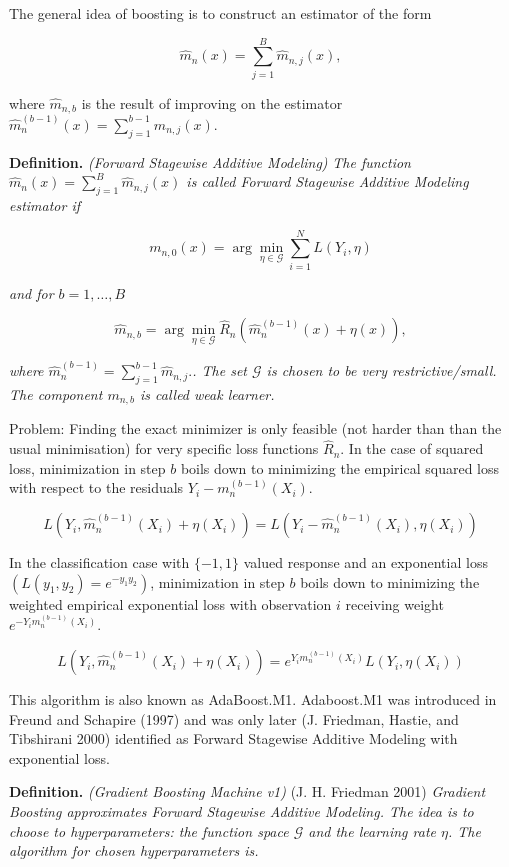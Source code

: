 \documentclass[a4paper,12pt,openany]{book}
\begin{document}
The general idea of boosting is to construct an estimator of the form

\[
\hat m_n(x)=\sum_{j=1}^B \hat m_{n,j}(x),
\]

where \(\hat m_{n,b}\) is the result of improving on the estimator \(\hat m_n^{(b-1)}(x)=\sum_{j=1}^{b-1} \hat m_{n,j}(x)\).

\textbf{Definition.} \emph{(Forward Stagewise Additive Modeling)} \emph{The function \(\hat m_n(x)=\sum_{j=1}^B \hat m_{n,j}(x)\) is called Forward Stagewise Additive Modeling estimator if}

\[
m_{n,0}(x)=\arg \min_{\eta\in \mathcal G} \sum_{i=1}^N L\left(Y_i, \eta\right)
\]

\emph{and for \(b=1,\dots,B\)}

\[
\hat m_{n,b} =  \arg \min_{\eta\in \mathcal G} \hat R_n\left( \hat m_n^{(b-1)}(x)+\eta(x)\right),
\]

\emph{where \(\hat m_n^{(b-1)}=\sum_{j=1}^{b-1}\hat m_{n,j}.\). The set \(\mathcal G\) is chosen to be very restrictive/small. The component \(m_{n,b}\) is called weak learner.}

Problem: Finding the exact minimizer is only feasible (not harder than than the usual minimisation) for very specific loss functions \(\hat R_n\). In the case of squared loss, minimization in step \(b\) boils down to minimizing the empirical squared loss with respect to the residuals \(Y_i- m_n^{(b-1)}(X_i)\).

\[
L\left(Y_i, \hat m_n^{(b-1)}(X_i)+\eta(X_i)\right)=L\left(Y_i-\hat m_n^{(b-1)}(X_i),\eta(X_i)\right)
\]

In the classification case with \(\{-1,1\}\) valued response and an exponential loss \((L(y_1,y_2)=e^{-y_1y_2})\), minimization in step \(b\) boils down to minimizing the weighted empirical exponential loss with observation \(i\) receiving weight \(e^{-Y_im_n^{(b-1)}(X_i)}\).

\[
L\left(Y_i,  \hat m_n^{(b-1)}(X_i)+\eta(X_i)\right)=e^{Y_im_n^{(b-1)}(X_i)}L\left(Y_i,\eta(X_i)\right)
\]

This algorithm is also known as AdaBoost.M1. Adaboost.M1 was introduced in Freund and Schapire (1997) and was only later (J. Friedman, Hastie, and Tibshirani 2000) identified as Forward Stagewise Additive Modeling with exponential loss.

\textbf{Definition.} \emph{(Gradient Boosting Machine v1)} (J. H. Friedman 2001) \emph{Gradient Boosting approximates Forward Stagewise Additive Modeling. The idea is to choose to hyperparameters: the function space \(\mathcal G\) and the learning rate \(\eta\). The algorithm for chosen hyperparameters is.}
\end{document}
